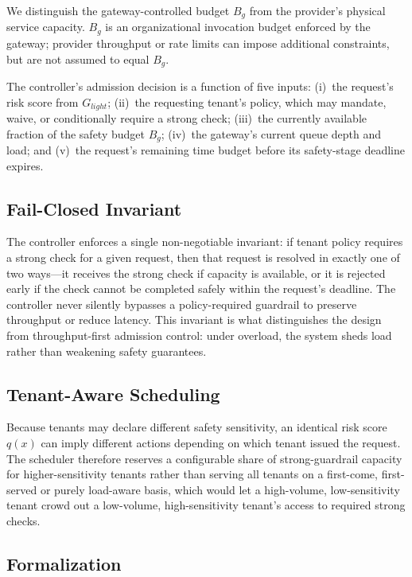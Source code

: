 \documentclass[conference]{IEEEtran}
\newcommand{\Glight}{G_{\mathit{light}}}
\newcommand{\Bg}{B_g}
\begin{document}
We distinguish the gateway-controlled budget $\Bg$ from the provider's physical service capacity. $\Bg$ is an organizational invocation budget enforced by the gateway; provider throughput or rate limits can impose additional constraints, but are not assumed to equal $\Bg$.

The controller's admission decision is a function of five inputs: (i)~the request's risk score from $\Glight$; (ii)~the requesting tenant's policy, which may mandate, waive, or conditionally require a strong check; (iii)~the currently available fraction of the safety budget $\Bg$; (iv)~the gateway's current queue depth and load; and (v)~the request's remaining time budget before its safety-stage deadline expires.

\subsection{Fail-Closed Invariant}

The controller enforces a single non-negotiable invariant: if tenant policy requires a strong check for a given request, then that request is resolved in exactly one of two ways---it receives the strong check if capacity is available, or it is rejected early if the check cannot be completed safely within the request's deadline. The controller never silently bypasses a policy-required guardrail to preserve throughput or reduce latency. This invariant is what distinguishes the design from throughput-first admission control: under overload, the system sheds load rather than weakening safety guarantees.

\subsection{Tenant-Aware Scheduling}

Because tenants may declare different safety sensitivity, an identical risk score $q(x)$ can imply different actions depending on which tenant issued the request. The scheduler therefore reserves a configurable share of strong-guardrail capacity for higher-sensitivity tenants rather than serving all tenants on a first-come, first-served or purely load-aware basis, which would let a high-volume, low-sensitivity tenant crowd out a low-volume, high-sensitivity tenant's access to required strong checks.

\subsection{Formalization}
\label{sec:formal}
\end{document}
